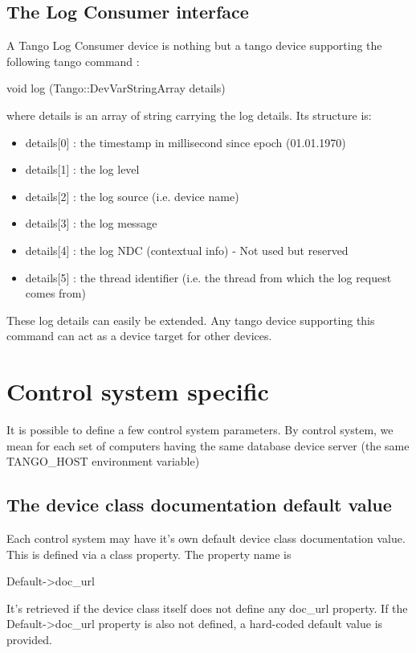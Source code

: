 \subsection{The Log Consumer interface}

A Tango Log Consumer device is nothing but a tango device supporting
the following tango command : \begin{center}void log (Tango::DevVarStringArray
details)\end{center} where details is an array of string carrying
the log details. Its structure is:
\begin{itemize}
\item details{[}0{]} : the timestamp in millisecond since epoch (01.01.1970) 
\item details{[}1{]} : the log level
\item details{[}2{]} : the log source (i.e. device name)
\item details{[}3{]} : the log message
\item details{[}4{]} : the log NDC (contextual info) - Not used but reserved
\item details{[}5{]} : the thread identifier (i.e. the thread from which
the log request comes from)
\end{itemize}
These log details can easily be extended. Any tango device supporting
this command can act as a device target for other devices. 


\section{Control system specific}

It is possible to define a few control system parameters. By control
system, we mean for each set of computers having the same database
device server (the same TANGO\_HOST environment variable)


\subsection{The device class documentation default value}

Each control system may have it's own default device class documentation
value. This is defined via a class property. The property name is
\begin{center}Default->doc\_url\end{center} It's retrieved if the
device class itself does not define any doc\_url property. If the
Default->doc\_url property is also not defined, a hard-coded default
value is provided.


